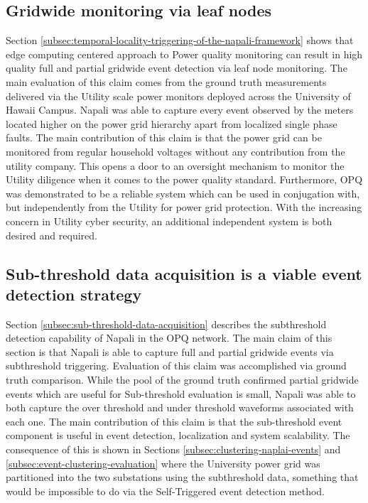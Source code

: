 \subsection{Gridwide monitoring via leaf nodes}\label{subsec:conc:gridwide-monitoring-via-leaf-nodes}
Section \ref{subsec:temporal-locality-triggering-of-the-napali-framework} shows that edge computing centered approach to Power quality monitoring can result in high quality
full and partial gridwide event detection via leaf node monitoring.
The main evaluation of this claim comes from the ground truth measurements delivered via the Utility scale power monitors deployed across the University of Hawaii Campus.
Napali was able to capture every event observed by the meters located higher on the power grid hierarchy apart from localized single phase faults.
The main contribution of this claim is that the power grid can be monitored from regular household voltages without any contribution from the utility company.
This opens a door to an oversight mechanism to monitor the Utility diligence when it comes to the power quality standard.
Furthermore, OPQ was demonstrated to be a reliable system which can be used in conjugation with, but independently from the Utility for power grid protection.
With the increasing concern in Utility cyber security, an additional independent system is both desired and required.

\subsection{Sub-threshold data acquisition is a viable event detection strategy}\label{subsec:conc:sub-threshold-data-acquisition}
Section \ref{subsec:sub-threshold-data-acquisition} describes the subthreshold detection capability of Napali in the OPQ network.
The main claim of this section is that Napali is able to capture full and partial gridwide events via subthreshold triggering.
Evaluation of this claim was accomplished via ground truth comparison.
While the pool of the ground truth confirmed partial gridwide events which are useful for Sub-threshold evaluation is small,
Napali was able to both capture the over threshold and under threshold waveforms associated with each one.
The main contribution of this claim is that the sub-threshold event component is useful in event detection, localization and system scalability.
The consequence of this is shown in Sections \ref{subsec:clustering-naplai-events} and \ref{subsec:event-clustering-evaluation}
where the University power grid was partitioned into the two substations using the subthreshold data, something that would be impossible to do via the Self-Triggered event detection method.

